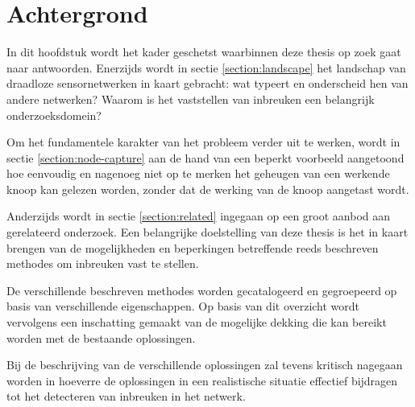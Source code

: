 \chapter{Achtergrond}
\label{chapter:achtergrond}

In dit hoofdstuk wordt het kader geschetst waarbinnen deze thesis op zoek gaat
naar antwoorden. Enerzijds wordt in sectie \ref{section:landscape} het
landschap van draadloze sensornetwerken in kaart gebracht: wat typeert en
onderscheid hen van andere netwerken? Waarom is het vaststellen van inbreuken
een belangrijk onderzoeksdomein?

Om het fundamentele karakter van het probleem verder uit te werken, wordt in
sectie \ref{section:node-capture} aan de hand van een beperkt voorbeeld
aangetoond hoe eenvoudig en nagenoeg niet op te merken het geheugen van een
werkende knoop kan gelezen worden, zonder dat de werking van de knoop aangetast
wordt.

Anderzijds wordt in sectie \ref{section:related} ingegaan op een groot aanbod
aan gerelateerd onderzoek. Een belangrijke doelstelling van deze thesis is het
in kaart brengen van de mogelijkheden en beperkingen betreffende reeds
beschreven methodes om inbreuken vast te stellen.

De verschillende beschreven methodes worden gecatalogeerd en gegroepeerd op
basis van verschillende eigenschappen. Op basis van dit overzicht wordt
vervolgens een inschatting gemaakt van de mogelijke dekking die kan bereikt
worden met de bestaande oplossingen.

Bij de beschrijving van de verschillende oplossingen zal tevens kritisch
nagegaan worden in hoeverre de oplossingen in een realistische situatie
effectief bijdragen tot het detecteren van inbreuken in het netwerk.






